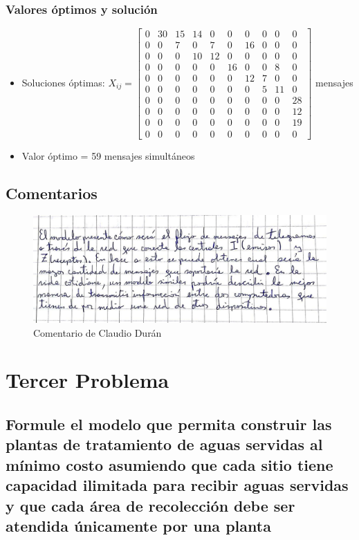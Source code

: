 \documentclass[a4paper,12pt]{article}
\begin{document}
\subsubsection{Valores óptimos y solución}
\begin{itemize}
	\item Soluciones óptimas: $X_{ij}=
	\begin{bmatrix}
		0 & 30 & 15 & 14 & 0 & 0 & 0 & 0 & 0 & 0\\
		0 & 0 & 7 & 0 & 7 & 0 & 16 & 0 & 0 & 0\\
		0 & 0 & 0 & 10 & 12 & 0 & 0 & 0 & 0 & 0\\
		0 & 0 & 0 & 0 & 0 & 16 & 0 & 0 & 8 & 0\\
		0 & 0 & 0 & 0 & 0 & 0 & 12 & 7 & 0 & 0\\
		0 & 0 & 0 & 0 & 0 & 0 & 0 & 5 & 11 & 0\\
		0 & 0 & 0 & 0 & 0 & 0 & 0 & 0 & 0 & 28\\
		0 & 0 & 0 & 0 & 0 & 0 & 0 & 0 & 0 & 12\\
		0 & 0 & 0 & 0 & 0 & 0 & 0 & 0 & 0 & 19\\
		0 & 0 & 0 & 0 & 0 & 0 & 0 & 0 & 0 & 0
	\end{bmatrix}$ mensajes
	\item Valor óptimo = 59 mensajes simultáneos
\end{itemize}
\newpage
\subsection{Comentarios}
\begin{figure}[H]
	\centering
	\includegraphics[scale=0.5]{claudio2.jpg}
	\caption*{Comentario de Claudio Durán}
\end{figure}
\newpage
\section{Tercer Problema}
\subsection{Formule  el  modelo  que  permita  construir  las  plantas de  tratamiento  de  aguas  servidas  al  mínimo  costo  asumiendo  que  cada  sitio  tiene  capacidad  ilimitada para  recibir  aguas  servidas  y  que  cada  área  de  recolección debe ser atendida únicamente por una planta}
\end{document}
